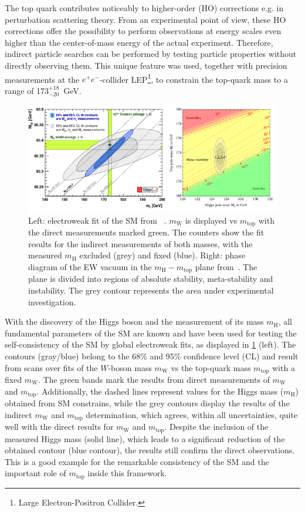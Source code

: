 The top quark contributes noticeably to higher-order (HO) corrections e.g. in perturbation scattering theory.  From an experimental point of view, these HO corrections offer the possibility to perform observations at energy scales even higher than the center-of-mass energy of the actual experiment. Therefore, indirect particle searches can be performed by testing particle properties without directly observing them. This unique feature was used, together with precision measurements at the $e^+e^-$-collider LEP\footnote{Large Electron-Positron Collider.}, to constrain the top-quark mass to a range of 173$^{+18}_{-20}$~GeV.~\cite{LEPEW:1994aa}
\begin{figure}[h]
	\centering
	\includegraphics[width=0.9\linewidth]{Pics/Relevanz}
	\caption{Left: electroweak fit of the SM from ~\cite{Baak:2012kk}. $m_{\text{W}}$ is displayed vs $m_{\text{top}}$ with the direct measurements marked green. The  counters show the fit results for the indirect measurements of both masses, with the measured $m_{\text{H}}$ excluded (grey) and fixed (blue).
		Right: phase diagram of the EW vacuum in the $m_{\text{H}}-m_{\text{top}}$ plane from~\cite{Buttazzo:2013uya}. The plane is divided into regions of absolute stability, meta-stability and instability. The grey contour represents the area under experimental investigation.}
	\label{fig:Relevanz}
\end{figure}

With the discovery of the Higgs boson and the measurement of its mass $m_{\text{H}}$, all fundamental parameters of the SM are known and have been used for testing the self-consistency of the SM by global electroweak fits, as displayed in \cref*{fig:Relevanz} (left). The contours (gray/blue) belong to the 68\% and 95\% confidence level (CL) and result from scans  over fits of the $W$-boson mass $m_{\text{W}}$ vs the top-quark mass $m_{\text{top}}$ with a fixed $m_{\text{W}}$. The green bands mark the results from direct measurements of $m_{\text{W}}$ and $m_{\text{top}}$. 
Additionally, the dashed lines represent values for the Higgs mass ($m_{\text{H}}$) obtained from SM constrains, while the grey contours display the results of the indirect $m_{\text{W}}$ and $m_{\text{top}}$ determination, which agrees, within all uncertainties, quite well with the direct results for $m_{\text{W}}$ and $m_{\text{top}}$.
Despite the inclusion of the measured  Higgs mass (solid line), which leads to a significant reduction of the obtained contour (blue contour), the results still confirm the direct observations. This is a good  example for the remarkable consistency of the SM and the important role of $m_{\text{top}}$ inside this framework.~\cite{Baak:2012kk}



